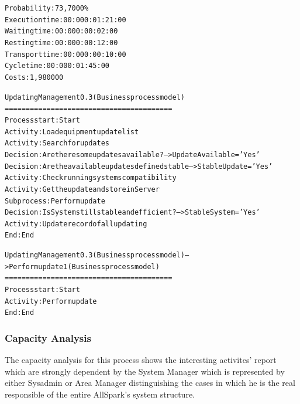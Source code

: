\begin{alltt}
Probability:   73,7000\%
Execution time:  00:000:01:21:00
Waiting time:  00:000:00:02:00
Resting time:  00:000:00:12:00
Transport time:  00:000:00:10:00
Cycle time:  00:000:01:45:00
Costs:  1,980000

Updating Management 0.3 (Business process model)
========================================
Process start: Start
Activity: Load equipment update list
Activity: Search for updates
Decision: Are there some updates available? --> UpdateAvailable='Yes'
Decision: Are the available updates defined stable --> StableUpdate='Yes'
Activity: Check running systems compatibility
Activity: Get the update and store in Server
Subprocess: Perform update
Decision: Is System still stable and efficient? --> StableSystem='Yes'
Activity: Update record of all updating
End: End

Updating Management 0.3 (Business process model) --> Perform update 1 (Business process model)
========================================
Process start: Start
Activity: Perform update
End: End
\end{alltt}


\subsubsection{Capacity Analysis}
The capacity analysis for this process shows the interesting activites' report which are strongly dependent by the System Manager which is represented by either Sysadmin or Area Manager distinguishing the cases in which he is the real responsible of the entire AllSpark's system structure.

